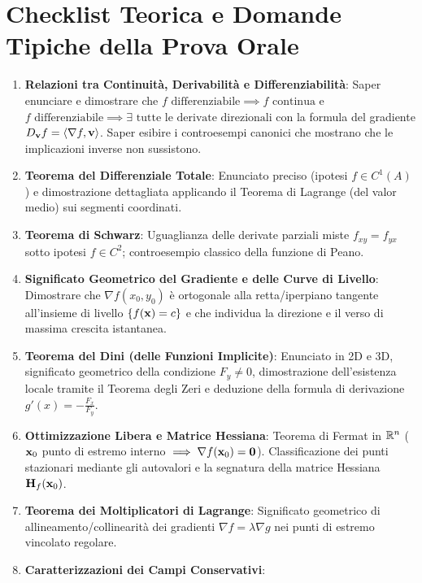 \section{Checklist Teorica e Domande Tipiche della Prova Orale}

\begin{esame}
\begin{enumerate}
    \item \textbf{Relazioni tra Continuità, Derivabilità e Differenziabilità}:
    Saper enunciare e dimostrare che $f \text{ differenziabile} \implies f \text{ continua}$ e $f \text{ differenziabile} \implies \exists \text{ tutte le derivate direzionali}$ con la formula del gradiente $D_{\mathbf{v}} f = \langle\nabla f, \mathbf{v}\rangle$. Saper esibire i controesempi canonici che mostrano che le implicazioni inverse non sussistono.
    \item \textbf{Teorema del Differenziale Totale}:
    Enunciato preciso (ipotesi $f \in C^1(A)$) e dimostrazione dettagliata applicando il Teorema di Lagrange (del valor medio) sui segmenti coordinati.
    \item \textbf{Teorema di Schwarz}:
    Uguaglianza delle derivate parziali miste $f_{xy} = f_{yx}$ sotto ipotesi $f \in C^2$; controesempio classico della funzione di Peano.
    \item \textbf{Significato Geometrico del Gradiente e delle Curve di Livello}:
    Dimostrare che $\nabla f(x_0,y_0)$ è ortogonale alla retta/iperpiano tangente all'insieme di livello $\{f(\mathbf{x}) = c\}$ e che individua la direzione e il verso di massima crescita istantanea.
    \item \textbf{Teorema del Dini (delle Funzioni Implicite)}:
    Enunciato in 2D e 3D, significato geometrico della condizione $F_y \neq 0$, dimostrazione dell'esistenza locale tramite il Teorema degli Zeri e deduzione della formula di derivazione $g'(x) = -\frac{F_x}{F_y}$.
    \item \textbf{Ottimizzazione Libera e Matrice Hessiana}:
    Teorema di Fermat in $\mathbb{R}^n$ ($\mathbf{x}_0$ punto di estremo interno $\implies \nabla f(\mathbf{x}_0) = \mathbf{0}$). Classificazione dei punti stazionari mediante gli autovalori e la segnatura della matrice Hessiana $\mathbf{H}_f(\mathbf{x}_0)$.
    \item \textbf{Teorema dei Moltiplicatori di Lagrange}:
    Significato geometrico di allineamento/collinearità dei gradienti $\nabla f = \lambda \nabla g$ nei punti di estremo vincolato regolare.
    \item \textbf{Caratterizzazioni dei Campi Conservativi}:

\end{enumerate}
\end{esame}

